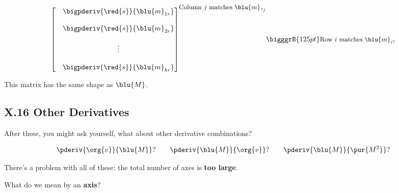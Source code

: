 \begin{definition}
\begin{equation*}
{\begin{bmatrix}
                        &
                        \begin{matrix}
                            \bigpderiv{ \red{s} } { \blu{m}_{1r} }\\ 
                            \\
                            \bigpderiv{ \red{s} } { \blu{m}_{2r} }\\ 
                            \\
                            \vdots \\ 
                            \\
                            \bigpderiv{ \red{s} } { \blu{m}_{kr} }
                        \end{matrix}
                    \end{bmatrix}
                }^{ \text{\small Column $j$ matches $\blu{m}_{?j}$} }
                \bigggrB{125pt} \text{\small Row $i$ matches $\blu{m}_{i?}$} 
            \end{equation*}
            
            This matrix has the same shape as $\blu{M}$.
        \end{definition}
        
        
     \secdiv  
    
    \subsection*{X.16 \quad Other Derivatives}
        \label{X.16}
    
        After these, you might ask yourself, what about other derivative combinations?
        
        \begin{equation}
            \pderiv{ \org{v} }{ \blu{M} }? 
            \qquad
            \pderiv{ \blu{M} }{ \org{v} }? 
            \qquad
            \pderiv{ \blu{M} }{ \pur{M^2} }? 
        \end{equation}
    
        There's a problem with all of these: the total number of axes is \textbf{too large}.
        
        What do we mean by an \textbf{axis}? \\
        
